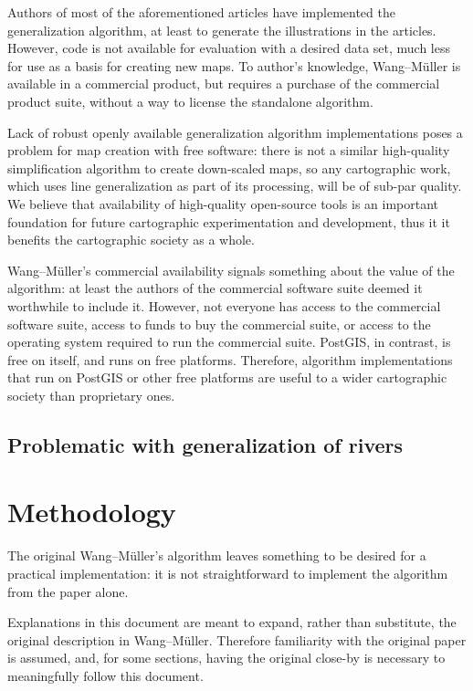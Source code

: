 \documentclass[a4paper]{article}
\newcommand{\WM}{Wang--M{\"u}ller}
\begin{document}
Authors of most of the aforementioned articles have implemented the
generalization algorithm, at least to generate the illustrations in the
articles. However, code is not available for evaluation with a desired data
set, much less for use as a basis for creating new maps. To author's knowledge,
{\WM}\cite{wang1998line} is available in a commercial product, but requires a
purchase of the commercial product suite, without a way to license the
standalone algorithm.

Lack of robust openly available generalization algorithm implementations poses
a problem for map creation with free software: there is not a similar
high-quality simplification algorithm to create down-scaled maps, so any
cartographic work, which uses line generalization as part of its processing,
will be of sub-par quality. We believe that availability of high-quality
open-source tools is an important foundation for future cartographic
experimentation and development, thus it it benefits the cartographic society
as a whole.

{\WM}'s commercial availability signals something about the value of the
algorithm: at least the authors of the commercial software suite deemed it
worthwhile to include it. However, not everyone has access to the commercial
software suite, access to funds to buy the commercial suite, or access to the
operating system required to run the commercial suite. PostGIS, in contrast, is
free on itself, and runs on free platforms. Therefore, algorithm
implementations that run on PostGIS or other free platforms are useful to a
wider cartographic society than proprietary ones.

\subsection{Problematic with generalization of rivers}

\section{Methodology}
\label{sec:methodology}

The original {\WM}'s algorithm \cite{wang1998line} leaves something to be
desired for a practical implementation: it is not straightforward to implement
the algorithm from the paper alone.

Explanations in this document are meant to expand, rather than substitute, the
original description in {\WM}. Therefore familiarity with the original paper is
assumed, and, for some sections, having the original close-by is necessary to
meaningfully follow this document.
\end{document}
